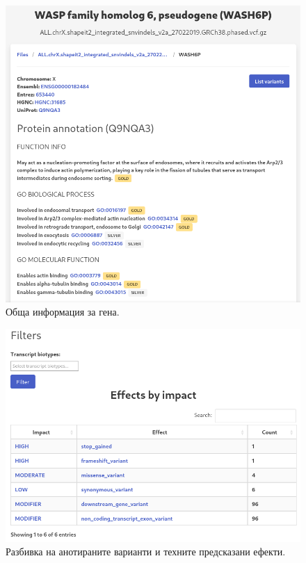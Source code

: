 \documentclass[pdftex,cyrillic,14pt,a4page,twoside,openright]{extreport}
\begin{document}
\begin{figure}[ht]
  \centering
  \includegraphics[width=16cm]{figures/gene_summary}
  \caption {Обща информация за гена.}
  \label{fig:gene_summary}
\end{figure}

\begin{figure}[ht]
  \centering
  \includegraphics[width=16cm]{figures/gene_summary_effects}
  \caption {Разбивка на анотираните варианти и техните предсказани ефекти.}
  \label{fig:gene_effects}
\end{figure}
\end{document}
